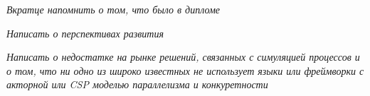 \conclusion

\textit{Вкратце напомнить о том, что было в дипломе}

\textit{Написать о перспективах развития}

\textit{Написать о недостатке на рынке решений, связанных с симуляцией процессов и о том, что ни одно из широко известных не использует языки или фреймворки с акторной или CSP моделью параллелизма и конкуретности}
